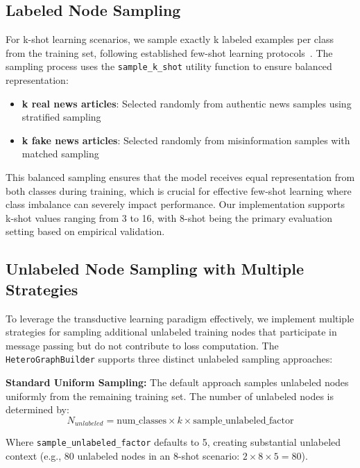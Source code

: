 \subsection{Labeled Node Sampling}

For k-shot learning scenarios, we sample exactly k labeled examples per class from the training set, following established few-shot learning protocols~\cite{wang2020fewshot, finn2017model}. The sampling process uses the \texttt{sample\_k\_shot} utility function to ensure balanced representation:
\begin{itemize}
    \item \textbf{k real news articles}: Selected randomly from authentic news samples using stratified sampling
    \item \textbf{k fake news articles}: Selected randomly from misinformation samples with matched sampling
\end{itemize}

This balanced sampling ensures that the model receives equal representation from both classes during training, which is crucial for effective few-shot learning where class imbalance can severely impact performance. Our implementation supports k-shot values ranging from 3 to 16, with 8-shot being the primary evaluation setting based on empirical validation.

\subsection{Unlabeled Node Sampling with Multiple Strategies}

To leverage the transductive learning paradigm effectively, we implement multiple strategies for sampling additional unlabeled training nodes that participate in message passing but do not contribute to loss computation. The \texttt{HeteroGraphBuilder} supports three distinct unlabeled sampling approaches:

\textbf{Standard Uniform Sampling:} The default approach samples unlabeled nodes uniformly from the remaining training set. The number of unlabeled nodes is determined by:
\begin{equation}
N_{unlabeled} = \text{num\_classes} \times k \times \text{sample\_unlabeled\_factor}
\end{equation}

Where \texttt{sample\_unlabeled\_factor} defaults to 5, creating substantial unlabeled context (e.g., 80 unlabeled nodes in an 8-shot scenario: $2 \times 8 \times 5 = 80$).

